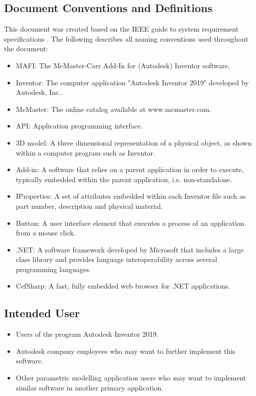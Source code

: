 \documentclass[12pt, letterpaper]{article}
\begin{document}
\subsection{Document Conventions and Definitions}
This document was created based on the IEEE guide to system requirement specifications \cite{SRSTemplate}. The following describes all naming conventions used throughout the document:
\begin{itemize}
    \item MAFI: The McMaster-Carr Add-In for (Autodesk) Inventor software.
    \item Inventor: The computer application "Autodesk Inventor 2019" developed by Autodesk, Inc.\cite{Inventor}.
    \item McMaster: The online catalog available at www.mcmaster.com\cite{McMaster}.
    \item API: Application programming interface.
    \item 3D model: A three dimensional representation of a physical object, as shown within a computer program such as Inventor.
    \item Add-in: A software that relies on a parent application in order to execute, typically embedded within the parent application, i.e. non-standalone.
    \item IProperties: A set of attributes embedded within each Inventor file such as part number, description and physical material.
    \item Button: A user interface element that executes a process of an application from a mouse click.
    \item .NET: A software framework developed by Microsoft that includes a large class library and provides language interoperability across several programming languages\cite{NET}.
    \item CefSharp: A fast, fully embedded web browser for .NET applications\cite{CEFSharp}.
\end{itemize}
\subsection{Intended User}
\begin{itemize}
    \item Users of the program Autodesk Inventor 2019.
    \item Autodesk company employees who may want to further implement this software.
    \item Other parametric modelling application users who may want to implement similar software in another primary application.
\end{itemize}
\end{document}
